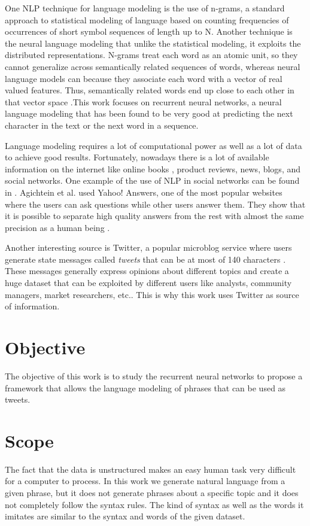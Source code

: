 One NLP technique for language modeling is the use of n-grams, a standard approach to statistical modeling of language based on counting frequencies of occurrences of short symbol sequences of length up to N. Another technique is the neural language modeling that unlike the statistical modeling, it exploits the  distributed representations. N-grams treat each word as an atomic unit, so they cannot generalize across semantically related sequences of words, whereas neural language models can because they associate each word with a vector of real valued features. Thus, semantically related words end up close to each other in that vector space  \cite{lecun2015deep} .This work focuses on recurrent neural networks, a neural language modeling that has been found to be very good at predicting the next character in the text or the next word in a sequence.

Language modeling requires a lot of computational power as well as a lot of data to achieve good results. Fortunately, nowadays there is a lot of available information on the internet like online books , product reviews, news, blogs, and social networks. One example of the use of NLP in social networks can be found in   \cite{agichtein2008finding}.  Agichtein et al. used Yahoo! Answers, one of the most popular websites where the users can ask questions while other users answer them. They show that it is possible to separate high quality answers from the rest with almost the same precision as a human being . 

Another interesting source is Twitter, a popular microblog service where users  generate state messages called \textit{tweets} that can be at most of 140 characters \cite{go2009twitter}. These messages generally express opinions about different topics and create a huge dataset that can be  exploited by different users like analysts, community managers, market researchers, etc.. This is why this work uses Twitter as source of information. 

\section{Objective}
The objective of this work is to study the recurrent neural networks to propose a framework that allows the language modeling  of phrases that can be used as tweets. 

\section{Scope}
The fact that the data is unstructured makes an easy human task  very difficult for a computer to process. In this work we generate natural language from a given phrase, but it does not generate phrases about a specific topic and it does not completely follow the syntax rules. The kind of syntax as well as the words it imitates are similar to the syntax and words of the given dataset. 

